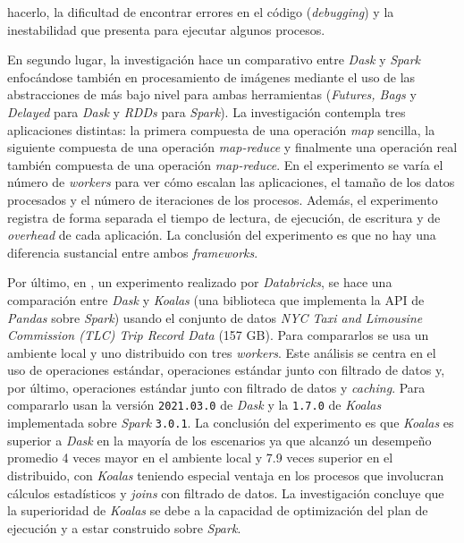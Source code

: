 hacerlo, la dificultad de encontrar errores en el código (\textit{debugging}) y la inestabilidad que presenta para ejecutar algunos procesos.

En segundo lugar, la investigación \cite{dask-spark-neuroimaging} hace un comparativo entre \textit{Dask} y \textit{Spark} enfocándose también en procesamiento de imágenes mediante el uso de las abstracciones de más bajo nivel para ambas herramientas (\textit{Futures, Bags} y \textit{Delayed} para \textit{Dask} y \textit{RDDs} para \textit{Spark}). La investigación contempla tres aplicaciones distintas: la primera compuesta de una operación \textit{map} sencilla, la siguiente compuesta de una operación \textit{map-reduce} y finalmente una operación real también compuesta de una operación \textit{map-reduce}. En el experimento se varía el número de \textit{workers} para ver cómo escalan las aplicaciones, el tamaño de los datos procesados y el número de iteraciones de los procesos. Además, el experimento registra de forma separada el tiempo de lectura, de ejecución, de escritura y de \textit{overhead} de cada aplicación. La conclusión del experimento es que no hay una diferencia sustancial entre ambos \textit{frameworks}.

Por último, en \cite{koalas-dask}, un experimento realizado por \textit{Databricks}, se hace una comparación entre \textit{Dask} y \textit{Koalas} (una biblioteca que implementa la API de \textit{Pandas} sobre \textit{Spark}) usando el conjunto de datos \textit{NYC Taxi and Limousine Commission (TLC) Trip Record Data} (157 GB). Para compararlos se usa un ambiente local y uno distribuido con tres \textit{workers}. Este análisis se centra en el uso de operaciones estándar, operaciones estándar junto con filtrado de datos y, por último, operaciones estándar junto con filtrado de datos y \textit{caching}. Para compararlo usan la versión \texttt{2021.03.0} de \textit{Dask} y la \texttt{1.7.0} de \textit{Koalas} implementada sobre \textit{Spark} \texttt{3.0.1}. La conclusión del experimento es que \textit{Koalas} es superior a \textit{Dask} en la mayoría de los escenarios ya que alcanzó un desempeño promedio 4 veces mayor en el ambiente local y 7.9 veces superior en el distribuido, con \textit{Koalas} teniendo especial ventaja en los procesos que involucran cálculos estadísticos y \textit{joins} con filtrado de datos. La investigación concluye que la superioridad de \textit{Koalas} se debe a la capacidad de optimización del plan de ejecución y a estar construido sobre \textit{Spark}.

\newpage

